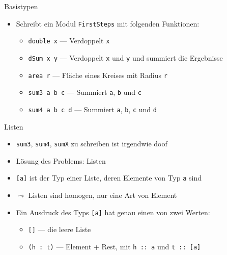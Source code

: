 \documentclass{beamer}
\begin{document}
\begin{frame}{Basistypen}

	\begin{itemize}
		\item Schreibt ein Modul \texttt{FirstSteps} mit folgenden Funktionen:
		\begin{itemize}
			\item \texttt{double x} --- Verdoppelt \texttt{x}
			\item \texttt{dSum x y} --- Verdoppelt \texttt{x} und \texttt{y} und summiert die Ergebnisse
			\item \texttt{area r} --- Fläche eines Kreises mit Radius \texttt{r}
			\item \texttt{sum3 a b c} --- Summiert \texttt{a}, \texttt{b} und \texttt{c}
			\item \texttt{sum4 a b c d} --- Summiert \texttt{a}, \texttt{b}, \texttt{c} und \texttt{d}
		\end{itemize}
	\end{itemize}
\end{frame}

\begin{frame}{Listen}
	\begin{itemize}
		\item \texttt{sum3}, \texttt{sum4}, \texttt{sumX} zu schreiben ist irgendwie doof
		\pause
		\item Lösung des Problems: Listen
		\item \texttt{[a]} ist der Typ einer Liste, deren Elemente von Typ \texttt{a} sind
		\item $\leadsto$ Listen sind homogen, nur eine Art von Element
	\end{itemize}


	\begin{itemize}
		\item Ein Ausdruck des Typs \texttt{[a]} hat genau einen von zwei Werten:
		\begin{itemize}
			\item \texttt{[]} --- die leere Liste
			\item \texttt{(h : t)} --- Element + Rest, mit \texttt{h :: a} und \texttt{t :: [a]}
		\end{itemize}
	\end{itemize}
\end{frame}
\end{document}
